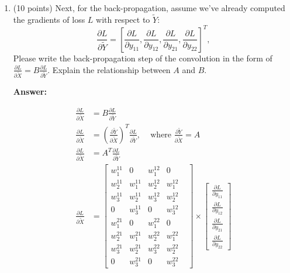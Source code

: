 \documentclass[11pt]{article}
\begin{document}
\begin{enumerate}
\begin{enumerate}
    \item (10 points) Next, for the back-propagation, assume we've already computed the gradients of loss $L$ with respect to
    $\tilde Y$:
    \begin{equation}
    \frac{\partial L}{\partial \tilde Y}=\left [\frac{\partial L}{\partial y_{11}}, \frac{\partial L}{\partial y_{12}}, \frac{\partial L}{\partial y_{21}}, \frac{\partial L}{\partial y_{22}} \right ]^T,
    \end{equation}
    Please write the back-propagation step of the convolution in
    the form of $\frac{\partial L}{\partial \tilde
    X}=B\frac{\partial L}{\partial \tilde Y}.$ Explain the
    relationship between $A$ and $B$.

    \textbf{Answer: }

    \[
    \begin{aligned}
    \frac{\partial L}{\partial\tilde X} &= B\frac{\partial L}{\partial \tilde Y}\\[8pt]
    \frac{\partial L}{\partial\tilde X} &= \left(\frac{\partial \tilde Y}{\partial \tilde X}\right)^T \frac{\partial L}{\partial \tilde Y} \text{,} \quad \text{ where } \frac{\partial \tilde Y}{\partial \tilde X} = A\\[8pt]
    \frac{\partial L}{\partial\tilde X} &= A^T \frac{\partial L}{\partial \tilde Y}\\[8pt]
    \frac{\partial L}{\partial\tilde X} &= \begin{bmatrix}

            w_1^{11}&0&w_1^{12}&0\\[5pt]
            w_2^{11}&w_1^{11}&w_2^{12}&w_1^{12}\\[5pt]
            w_3^{11}&w_2^{11}&w_3^{12}&w_2^{12}\\[5pt]
            0&w_3^{11}&0&w_3^{12}&\\[5pt]
            w_1^{21}&0&w_1^{22}&0\\[5pt]
            w_2^{21}&w_1^{21}&w_2^{22}&w_1^{22}\\[5pt]
            w_3^{21}&w_2^{21}&w_3^{22}&w_2^{22}\\[5pt]
            0&w_3^{21}&0&w_3^{22}
        \end{bmatrix} \times \begin{bmatrix}
        \frac{\partial L}{\partial y_{11}}\\[5pt]
        \frac{\partial L}{\partial y_{12}}\\[5pt]
        \frac{\partial L}{\partial y_{21}}\\[5pt]
        \frac{\partial L}{\partial y_{22}}
        \end{bmatrix}
    \end{aligned}
    \]


\end{enumerate}
\end{enumerate}
\end{document}
